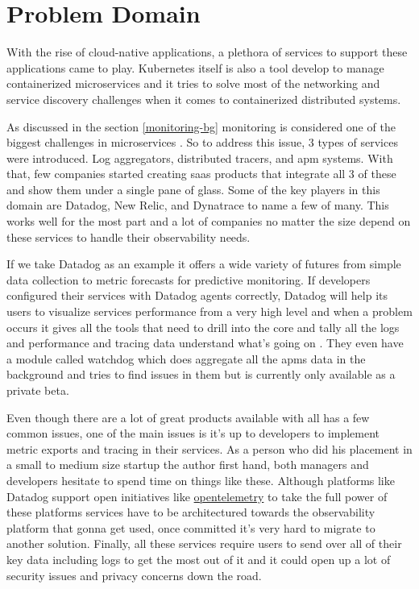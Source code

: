 
{\let\clearpage\relax \chapter{Problem Domain}}

With the rise of cloud-native applications, \citep{CloudAdo16:online} a plethora of services to support these applications came to play. Kubernetes itself is also a tool develop to manage containerized microservices and it tries to solve most of the networking and service discovery challenges when it comes to containerized distributed systems.

As discussed in the section \ref{monitoring-bg} monitoring is considered one of the biggest challenges in microservices \citep{Understa56:online}. So to address this issue, 3 types of services were introduced. Log aggregators, distributed tracers, and \ac{apm} systems. With that, few companies started creating \ac{saas} products that integrate all 3 of these and show them under a single pane of glass. Some of the key players in this domain are Datadog, New Relic, and Dynatrace to name a few of many. This works well for the most part and a lot of companies no matter the size depend on these services to handle their observability needs.

If we take Datadog as an example it offers a wide variety of futures from simple data collection to metric forecasts for predictive monitoring. If developers configured their services with Datadog agents correctly, Datadog will help its users to visualize services performance from a very high level and when a problem occurs it gives all the tools that need to drill into the core and tally all the logs and performance and tracing data understand what's going on \citep{Datadog18:online}. They even have a module called watchdog which does aggregate all the \acp{apm} data in the background and tries to find issues in them but is currently only available as a private beta.

Even though there are a lot of great products available with all has a few common issues, one of the main issues is it's up to developers to implement metric exports and tracing in their services. As a person who did his placement in a small to medium size startup the author first hand, both managers and developers hesitate to spend time on things like these. Although platforms like Datadog support open initiatives like \href{https://opentelemetry.io/}{opentelemetry} to take the full power of these platforms services have to be architectured towards the observability platform that gonna get used, once committed it's very hard to migrate to another solution. Finally, all these services require users to send over all of their key data including logs to get the most out of it and it could open up a lot of security issues and privacy concerns down the road.

